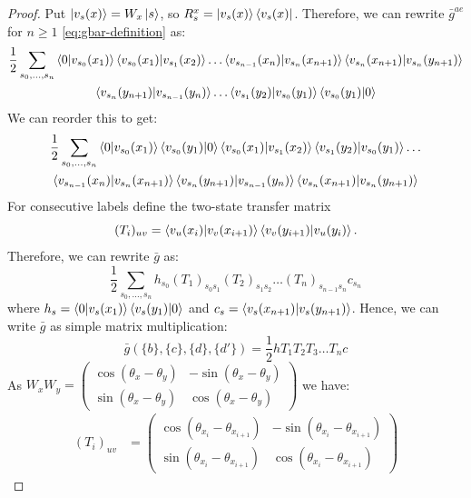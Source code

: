 \begin{proof}
Put $\ket{v_s(x)}=W_x\ket{s}$, so
$R_s^x=\ket{v_s(x)}\bra{v_s(x)}$. Therefore, we can rewrite $\bar g^{ae}$ for $n\geq 1$ \eqref{eq:gbar-definition} as:
\begin{multline}
    \frac{1}{2}\sum_{s_0,\ldots,s_n} \braket{0|v_{s_0}(x_1)}\braket{v_{s_0}(x_1)|v_{s_1}(x_2)}\ldots \braket{v_{s_{n-1}}(x_n)|v_{s_n}(x_{n+1})}\braket{v_{s_n}(x_{n+1})|v_{s_n}(y_{n+1})}\\\braket{v_{s_n}(y_{n+1})|v_{s_{n-1}}(y_n)}\ldots\braket{v_{s_1}(y_2)|v_{s_0}(y_1)}\braket{v_{s_0}(y_1)|0}
\end{multline}
We can reorder this to get:
\begin{multline}
    \frac{1}{2}\sum_{s_0,\ldots,s_n} \braket{0|v_{s_0}(x_1)}\braket{v_{s_0}(y_1)|0}\braket{v_{s_0}(x_1)|v_{s_1}(x_2)}\braket{v_{s_1}(y_2)|v_{s_0}(y_1)}\ldots\\ \braket{v_{s_{n-1}}(x_{n})|v_{s_{n}}(x_{n+1})}\braket{v_{s_{n}}(y_{n+1})|v_{s_{n-1}}(y_{n})}\braket{v_{s_{n}}(x_{n+1})|v_{s_{n}}(y_{n+1})}
\end{multline}
For consecutive labels define
the two-state transfer matrix
\begin{equation}
    (T_i)_{uv}=\braket{v_u(x_i)|v_v(x_{i+1})}
    \braket{v_v(y_{i+1})|v_u(y_i)}.
\end{equation}
Therefore, we can rewrite $\bar g$ as:
\begin{equation}
   \frac{1}{2}\sum_{s_0,\ldots,s_n} h_{s_0}(T_1)_{s_0s_1}(T_2)_{s_1s_2}\ldots (T_n)_{s_{n-1}s_{n}} c_{s_n}
\end{equation}
where $h_s = \braket{0|v_{s}(x_1)}\braket{v_{s}(y_1)|0}$ and $c_s =\braket{v_{s}(x_{n+1})|v_{s}(y_{n+1})}$. Hence, we can write $\bar g$ as simple matrix multiplication:
\begin{equation}
    \bar g(\{b\},\{c\},\{d\},\{d'\}) = \frac{1}{2}hT_1T_2T_3\ldots T_nc
\end{equation}
As $W_xW_y = \begin{pmatrix}
    \cos (\theta_x - \theta_y) & - \sin (\theta_x - \theta_y)\\
     \sin (\theta_x - \theta_y) & \cos (\theta_x - \theta_y)
\end{pmatrix}$ we have:
\begin{align}
    (T_i)_{u v} &=  \begin{pmatrix}
    \cos (\theta_{x_i} - \theta_{x_{i+1}}) & - \sin (\theta_{x_i} - \theta_{x_{i+1}})\\
     \sin (\theta_{x_i} - \theta_{x_{i+1}}) & \cos (\theta_{x_i} - \theta_{x_{i+1}})

\end{pmatrix}
\end{align}
\end{proof}
